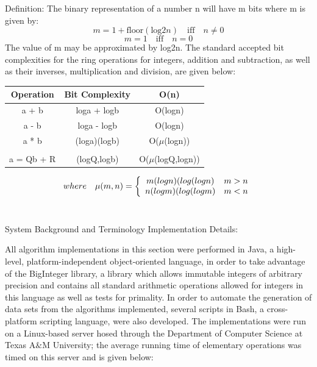 \documentclass[11pt]{article}
\begin{document}
Definition: The binary representation of a number n will have m bits where m is given by:
	$$m = 1 + \mathrm{floor}(\mathrm{log}2n)\quad \mathrm{iff}\quad n \neq 0$$
	$$m = 1\quad \mathrm{iff}\quad n = 0$$
\indent The value of m may be approximated by log2n. The standard accepted bit complexities for the ring operations for integers, addition and subtraction, as well as their inverses, multiplication and division, are given below:
\begin{center}
\begin{tabular}{c|c|c}

	Operation & Bit Complexity & O(n)\\
	\hline
	a + b &  loga + logb & O(logn)\\
	a - b &  loga - logb & O(logn)\\
	a * b &  (loga)(logb) & O($\mu$(logn))\\
	\\
	a = Qb + R & (logQ,logb) & O($\mu$(logQ,logn))
	
\end{tabular}
\end{center}
\begin{displaymath} where \quad \mu(m,n) = \left\{
	\begin{array}{c c}
	m(logn)(log(logn) & m > n\\
	n(logm)(log(logm) & m < n\\
	\end{array}
	\right. 
\end{displaymath}
\\
\begin{center}
System Background and Terminology
Implementation Details:
\end{center}
 

\indent
All algorithm implementations in this section were performed in Java, a high-level, platform-independent object-oriented language, in order to take advantage of the BigInteger library, a library which allows immutable integers of arbitrary precision and contains all standard arithmetic operations allowed for integers in this language as well as tests for primality. In order to automate the generation of data sets from the algorithms implemented, several scripts in Bash, a cross-platform scripting language, were also developed. The implementations were run on a Linux-based server hosed through the Department of Computer Science at Texas A$\&$M University; the average running time of elementary operations was timed on this server and is given below:
\end{document}
